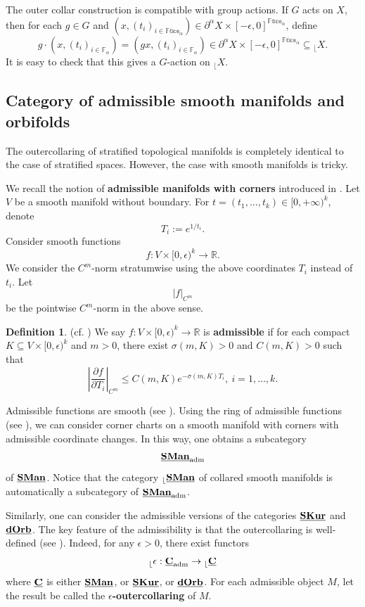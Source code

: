 \documentclass[reqno, 10pt]{amsart}
\numberwithin{equation}{section}
\numberwithin{equation}{section}
\renewcommand{\subset}{\subseteq}
\theoremstyle{definition}
\newtheorem{defn}[thm]{Definition}
\theoremstyle{remark}
\newcommand{\beqn}{\begin{equation*}}
\newcommand{\eeqn}{\end{equation*}}
\newcommand{\mb}{\mathbb}
\newcommand{\bF}{{\mathbb F}}
\renewcommand{\outer}{{}_{\lfloor}}
\newcommand{\uds}[1]{\underline{\smash{#1}}}
\begin{document}
The outer collar construction is compatible with group actions. If $G$ acts on $X$, then for each $g \in G$ and $(x, (t_i)_{i \in \mb{Face}_\alpha} )\in \partial^\alpha X \times [-\epsilon, 0]^{\mb{Face}_\alpha }$, define
\beqn
g \cdot (x, (t_i)_{i \in \bF_\alpha} ) = (gx, (t_i)_{i \in \bF_\alpha} ) \in \partial^\alpha X \times [-\epsilon, 0]^{\mb{Face}_\alpha } \subset \outer X.
\eeqn
It is easy to check that this gives a $G$-action on $\outer X$.

\subsection{Category of admissible smooth manifolds and orbifolds}\label{subsection_admissible_manifold}

The outercollaring of stratified topological manifolds is completely identical to the case of stratified spaces. However, the case with smooth manifolds is tricky. 


We recall the notion of {\bf admissible manifolds with corners} introduced in \cite[Chapter 25]{FOOO_Kuranishi}. Let $V$ be a smooth manifold without boundary. For $t = (t_1, \ldots, t_k) \in [0, +\infty)^k$, denote 
\beqn
T_i:= e^{1/t_i}.
\eeqn 
Consider smooth functions 
\beqn
f: V \times [0, \epsilon)^k \to {\mb R}.
\eeqn
We consider the $C^m$-norm stratumwise using the above coordinates $T_i$ instead of $t_i$. Let 
\beqn
|f|_{C^m}
\eeqn
be the pointwise $C^m$-norm in the above sense. 

\begin{defn}(cf. \cite[Definition 25.3]{FOOO_Kuranishi}) We say $f: V \times [0, \epsilon)^k \to {\mb R}$ is {\bf admissible} if for each compact $K \subset V \times [0, \epsilon)^k$ and $m > 0$, there exist $\sigma(m, K)>0$ and $C(m, K)>0$ such that 
\beqn
\left| \frac{\partial f}{\partial T_i} \right|_{C^m} \leq C(m, K) e^{-\sigma(m, K) T_i},\ i = 1, \ldots, k.
\eeqn    
\end{defn}

Admissible functions are smooth (see \cite[Remark 25.5]{FOOO_Kuranishi}). Using the ring of admissible functions (see \cite[Lemma 25.13]{FOOO_Kuranishi}), we can consider corner charts on a smooth manifold with corners with admissible coordinate changes. In this way, one obtains a subcategory
\beqn
\uds{\bf SMan}_{\rm adm}
\eeqn
of $\uds{\bf SMan}$. Notice that the category $\outer \uds{\bf SMan}$ of collared smooth manifolds is automatically a subcategory of $\uds{\bf SMan}_{\rm adm}$.

Similarly, one can consider the admissible versions of the categories $\uds{\bf SKur}$ and $\uds{\bf dOrb}$. The key feature of the admissibility is that the outercollaring is well-defined (see \cite[Section 17.3]{FOOO_Kuranishi}). Indeed, for any $\epsilon>0$, there exist functors
\beqn
\outer \epsilon: \uds{\bf C}_{\rm adm} \to \outer \uds{\bf C}
\eeqn
where $\uds{\bf C}$ is either $\uds{\bf SMan}$, or $\uds{\bf SKur}$, or $\uds{\bf dOrb}$. For each admissible object $M$, let the result be called the {\bf $\epsilon$-outercollaring} of $M$. 
\end{document}
